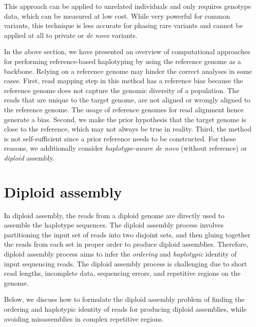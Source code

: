 This approach can be applied to unrelated individuals and only requires genotype data, which can be
measured at low cost. While very powerful for common variants, this technique is less accurate for
phasing rare variants and cannot be applied at all to private or \textit{de novo} variants.
\bigskip

In the above section, we have presented an overview of computational approaches for performing reference-based haplotyping by using the reference genome as a backbone. 
Relying on a reference genome may hinder the correct analyses in some cases.
First, read mapping step in this method has a reference bias because the reference genome does not capture the genomic diversity of a population.
The reads that are unique to the target genome, are not aligned or wrongly aligned to the reference genome.
The usage of reference genomes for read alignment hence generate a bias. 
Second, we make the prior hypothesis that the target genome is close to the reference, which may not always be true in reality.
Third, the method is not self-sufficient since a prior reference needs to be
constructed. For these reasons, we additionally consider \textit{haplotype-aware de novo} (without reference) or \textit{diploid} assembly.

\section{Diploid assembly}\label{sec:dip}
In diploid assembly, the reads from a diploid genome are directly used to assemble the haplotype sequences. 
The diploid assembly process involves partitioning the input set of reads into two disjoint sets, and then gluing together the reads from each set in proper order to produce diploid assemblies.
Therefore, diploid assembly process aims to infer the \textit{ordering} and \textit{haplotypic} identity of input sequencing reads. 
The diploid assembly process is challenging due to short read lengths, incomplete data, sequencing errors, and repetitive regions on the genome.

Below, we discuss how to formulate the diploid assembly problem of finding the ordering and haplotypic identity of reads for producing diploid assemblies, while avoiding misassemblies in complex repetitive regions.

